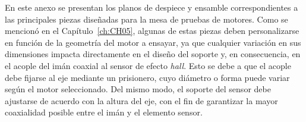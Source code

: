 En este anexo se presentan los planos de despiece y ensamble correspondientes a las principales piezas diseñadas para la mesa de pruebas de motores. Como se mencionó en el Capítulo~\ref{ch:CH05}, algunas de estas piezas deben personalizarse en función de la geometría del motor a ensayar, ya que cualquier variación en sus dimensiones impacta directamente en el diseño del soporte y, en consecuencia, en el acople del imán coaxial al sensor de efecto \textit{hall}. Esto se debe a que el acople debe fijarse al eje mediante un prisionero, cuyo diámetro o forma puede variar según el motor seleccionado. Del mismo modo, el soporte del sensor debe ajustarse de acuerdo con la altura del eje, con el fin de garantizar la mayor coaxialidad posible entre el imán y el elemento sensor.


\begin{landscape}
\label{plano base}

\end{landscape}

\begin{landscape}
\label{plano ensamble}


\end{landscape}

\begin{landscape}
\label{plano base superior}


\end{landscape}

\begin{landscape}
\label{plano ensamble}


\end{landscape}

\begin{landscape}
\label{plano ensamble}


\end{landscape}

\begin{landscape}
\label{plano ensamble}


\end{landscape}